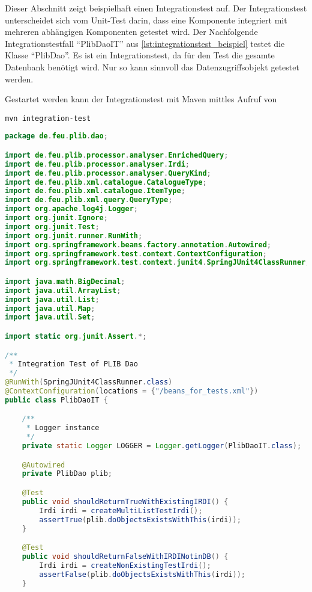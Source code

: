 Dieser Abschnitt zeigt beispielhaft einen Integrationstest auf. Der Integrationstest unterscheidet sich vom Unit-Test darin, dass eine Komponente integriert mit mehreren abhängigen Komponenten getestet wird. 
Der Nachfolgende Integrationstestfall \enquote{PlibDaoIT} aus \autoref{lst:integrationstest_beispiel} testet die Klasse \enquote{PlibDao}. Es ist ein Integrationstest, da für den Test die gesamte Datenbank benötigt wird. Nur so kann sinnvoll das Datenzugriffsobjekt getestet werden. 

Gestartet werden kann der Integrationstest mit Maven mittles Aufruf von 

\lstinline[basicstyle=\ttfamily\small\mdseries]{mvn integration-test}

\begin{lstlisting}[caption=Beispiel eines Integrationstests, language=Java, label=lst:integrationstest_beispiel]
package de.feu.plib.dao;

import de.feu.plib.processor.analyser.EnrichedQuery;
import de.feu.plib.processor.analyser.Irdi;
import de.feu.plib.processor.analyser.QueryKind;
import de.feu.plib.xml.catalogue.CatalogueType;
import de.feu.plib.xml.catalogue.ItemType;
import de.feu.plib.xml.query.QueryType;
import org.apache.log4j.Logger;
import org.junit.Ignore;
import org.junit.Test;
import org.junit.runner.RunWith;
import org.springframework.beans.factory.annotation.Autowired;
import org.springframework.test.context.ContextConfiguration;
import org.springframework.test.context.junit4.SpringJUnit4ClassRunner;

import java.math.BigDecimal;
import java.util.ArrayList;
import java.util.List;
import java.util.Map;
import java.util.Set;

import static org.junit.Assert.*;

/**
 * Integration Test of PLIB Dao
 */
@RunWith(SpringJUnit4ClassRunner.class)
@ContextConfiguration(locations = {"/beans_for_tests.xml"})
public class PlibDaoIT {

    /**
     * Logger instance
     */
    private static Logger LOGGER = Logger.getLogger(PlibDaoIT.class);

    @Autowired
    private PlibDao plib;

    @Test
    public void shouldReturnTrueWithExistingIRDI() {
        Irdi irdi = createMultiListTestIrdi();
        assertTrue(plib.doObjectsExistsWithThis(irdi));
    }

    @Test
    public void shouldReturnFalseWithIRDINotinDB() {
        Irdi irdi = createNonExistingTestIrdi();
        assertFalse(plib.doObjectsExistsWithThis(irdi));
    }


\end{lstlisting}
